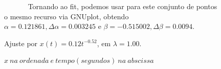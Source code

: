\documentclass[pdftex,12pt,a4paper]{article}
\begin{document}
\begin{figure}

~~~~~~ Tornando ao fit, podemos usar para este conjunto de pontos o mesmo recurso via GNUplot, obtendo $\alpha = 0.121861, \Delta \alpha = 0.003245$ e $\beta = -0.515002, \Delta \beta = 0.0094$.

\centering
\caption{Ajuste por $x(t) = 0.12t^{-0.52}$, em $\lambda = 1.00$.}
\caption*{$x\ na\ ordenada\ e\ tempo(segundos)\ na\ abscissa$}
\end{figure}
\end{document}
